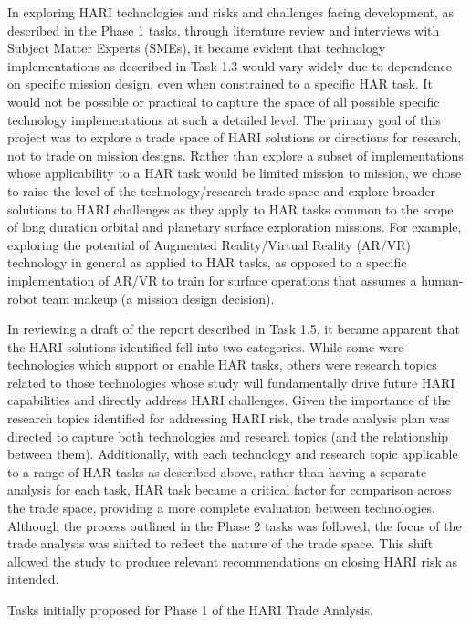 In exploring HARI technologies and risks and challenges facing development, as described in the Phase 1 tasks, through literature review and interviews with Subject Matter Experts (SMEs), it became evident that technology implementations as described in Task 1.3 would vary widely due to dependence on specific mission design, even when constrained to a specific HAR task.
It would not be possible or practical to capture the space of all possible specific technology implementations at such a detailed level.
The primary goal of this project was to explore a trade space of HARI solutions or directions for research, not to trade on mission designs.
Rather than explore a subset of implementations whose applicability to a HAR task would be limited mission to mission, we chose to raise the level of the technology/research trade space and explore broader solutions to HARI challenges as they apply to HAR tasks common to the scope of long duration orbital and planetary surface exploration missions.
For example, exploring the potential of Augmented Reality/Virtual Reality (AR/VR) technology in general as applied to HAR tasks, as opposed to a specific implementation of AR/VR to train for surface operations that assumes a human-robot team makeup (a mission design decision).

In reviewing a draft of the report described in Task 1.5, it became apparent that the HARI solutions identified fell into two categories.
While some were technologies which support or enable HAR tasks, others were research topics related to those technologies whose study will fundamentally drive future HARI capabilities and directly address HARI challenges.
Given the importance of the research topics identified for addressing HARI risk, the trade analysis plan was directed to capture both technologies and research topics (and the relationship between them).
Additionally, with each technology and research topic applicable to a range of HAR tasks as described above, rather than having a separate analysis for each task, HAR task became a critical factor for comparison across the trade space, providing a more complete evaluation between technologies.
Although the process outlined in the Phase 2 tasks was followed, the focus of the trade analysis was shifted to reflect the nature of the trade space.
This shift allowed the study to produce relevant recommendations on closing HARI risk as intended.

\begin{table}[tb]
    \centering
    \caption[Tasks initially proposed for Phase 1 of the HARI Trade Analysis]{Tasks initially proposed for Phase 1 of the HARI Trade Analysis.}
    \label{table:phase1}
\end{table}

